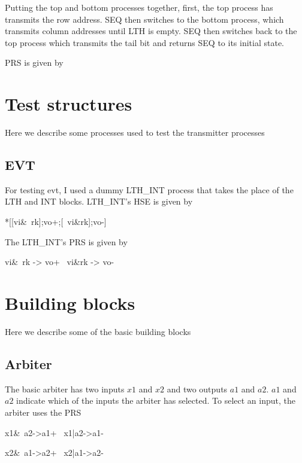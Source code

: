 \documentclass[aer.tex]{subfiles}
\begin{document}
Putting the top and bottom processes together, first, the top process has transmits the row address.
SEQ then switches to the bottom process, which transmits column addresses until LTH is empty. SEQ
then switches back to the top process which transmits the tail bit and returns SEQ to its initial state. 

PRS is given by

\begin{prs}
\end{prs}

\section{Test structures}
Here we describe some processes used to test the transmitter processes

\subsection{EVT}
For testing evt, I used a dummy LTH\_INT process that takes the place of the LTH and INT blocks.
LTH\_INT's HSE is given by

\begin{hse}
*[[vi&~rk];vo+;[~vi&rk];vo-]
\end{hse}

The LTH\_INT's PRS is given by 

\begin{prs}
vi&~rk -> vo+
~vi&rk -> vo-
\end{prs}

\section{Building blocks}
Here we describe some of the basic building blocks

\subsection{Arbiter}
\label{subsec:arb}

The basic arbiter has two inputs $x1$ and $x2$ and two outputs $a1$ and $a2$.
$a1$ and $a2$ indicate which of the inputs the arbiter has selected.
To select an input, the arbiter uses the PRS

\begin{prs2}
x1&~a2->a1+
~x1|a2->a1-

x2&~a1->a2+
~x2|a1->a2-
\end{prs2}
\end{document}
